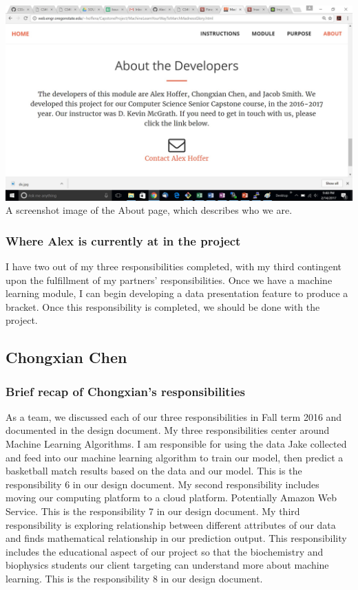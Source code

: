 \documentclass[letterpaper, 10pt,titlepage]{article}
\begin{document}
\includegraphics[width=\textwidth]{About.jpg}
A screenshot image of the About page, which describes who we are.

\subsubsection{Where Alex is currently at in the project}
\par I have two out of my three responsibilities completed, with my third contingent upon the fulfillment of my partners' responsibilities. Once we have a machine learning module, I can begin developing a data presentation feature to produce a bracket. Once this responsibility is completed, we should be done with the project.

\subsection{Chongxian Chen}

\subsubsection{Brief recap of Chongxian's responsibilities}
\par As a team, we discussed each of our three responsibilities in Fall term 2016 and documented in the design document. My three responsibilities center around Machine Learning Algorithms. I am responsible for using the data Jake collected and feed into our machine learning algorithm to train our model, then predict a basketball match results based on the data and our model. This is the responsibility 6 in our design document. My second responsibility includes moving our computing platform to a cloud platform. Potentially Amazon Web Service. This is the responsibility 7 in our design document. My third responsibility is exploring relationship between different attributes of our data and finds mathematical relationship in our prediction output. This responsibility includes the educational aspect of our project so that the biochemistry and biophysics students our client targeting can understand more about machine learning. This is the responsibility 8 in our design document.
   
\end{document}
